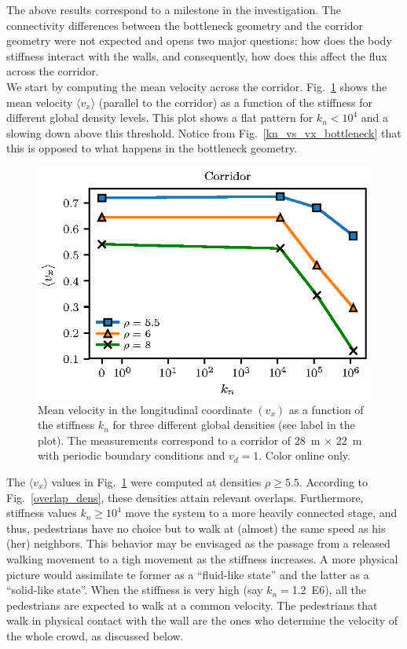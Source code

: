 \documentclass[preprint,12pt]{elsarticle}
\begin{document}
The above results correspond to a milestone in the 
investigation. The connectivity differences between the bottleneck geometry 
and the corridor geometry were not expected and opens two major questions: how 
does the body stiffness interact with the walls, and consequently, how does 
this affect the flux across the corridor.\\ 

We start by computing the mean velocity across the corridor.  
Fig.~\ref{kn_vs_vx_corridor} shows the mean velocity 
$\langle v_x\rangle$ (parallel to the corridor) as a function 
of the stiffness for different global density levels. This 
plot shows a flat pattern for $k_n<10^4$ and a slowing down above this 
threshold. Notice from Fig.~\ref{kn_vs_vx_bottleneck} that this is opposed
to what happens in the bottleneck geometry. \\


\begin{figure}[htbp!]
\centering
\includegraphics[width=0.7\columnwidth]{./kn_vs_vx_corridor.eps}
\caption{\label{kn_vs_vx_corridor} Mean velocity in the longitudinal coordinate $(v_x)$ as a function of the stiffness $k_n$ for three different global densities (see label in the plot). The measurements correspond to a corridor of 28~m $\times$ 22~m with periodic boundary conditions and $v_d=1$. Color online only.      }
\end{figure}

The $\langle v_x\rangle$ values in Fig.~\ref{kn_vs_vx_corridor} 
were computed at densities $\rho\geq 5.5$. According to 
Fig.~\ref{overlap_dens}, these densities attain relevant overlaps. Furthermore, 
stiffness values $k_n\geq 10^4$ move the system to a more heavily connected 
stage, and thus, pedestrians have no choice but to walk at 
(almost) the same speed as his (her) neighbors. This 
behavior may be envisaged as the passage from a released 
walking movement to a tigh movement as the stiffness increases. A more 
physical picture would assimilate te former as a ``fluid-like 
state'' and the latter as a ``solid-like state''. When the stiffness is 
very high (say $k_n=$1.2~E6), all the pedestrians 
are expected to walk at a common velocity. The 
pedestrians that walk in physical contact with the wall are the ones who 
determine the velocity of the whole crowd, as discussed 
below.\\
\end{document}

